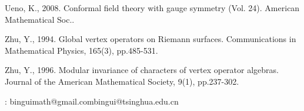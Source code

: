 \documentclass[12pt,a4paper,notitlepage]{article}
\theoremstyle{definition}
\theoremstyle{plain}
\numberwithin{equation}{section}
\begin{document}
\begin{thebibliography}{999999}
Ueno, K., 2008. Conformal field theory with gauge symmetry (Vol. 24). American Mathematical Soc..


Zhu, Y., 1994. Global vertex operators on Riemann surfaces. Communications in Mathematical Physics, 165(3), pp.485-531.

Zhu, Y., 1996. Modular invariance of characters of vertex operator algebras. Journal of the American Mathematical Society, 9(1), pp.237-302.
		
		
		
		
		
	\end{thebibliography}
	
	: binguimath@gmail.com\qquad bingui@tsinghua.edu.cn
\end{document}
